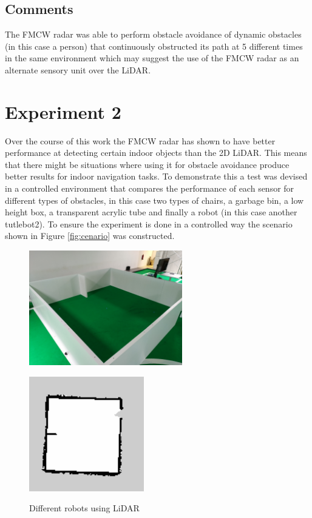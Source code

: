 \subsection{Comments}
 The \ac{FMCW} radar was able to perform 
obstacle avoidance of dynamic obstacles (in this case a person) that continuously obstructed its path at 5 different times in the same environment which may suggest the use of the \ac{FMCW} \ac{radar} as an alternate sensory unit over the \ac{LiDAR}.


\section {Experiment 2}
Over the course of this work the \ac{FMCW} radar has shown to have better performance at detecting certain indoor objects than the 2D \ac{LiDAR}. This means that there might be situations where using it for obstacle avoidance produce better results for indoor navigation tasks. To demonstrate this a test was devised in a controlled environment that compares the performance of each sensor for different types of obstacles, in this case two types of chairs, a garbage bin, a low height box, a transparent acrylic tube and finally a robot (in this case another tutlebot2).  
To ensure the experiment is done in a controlled way the scenario shown in Figure \ref{fig:cenario} was constructed. 
\begin{figure}[ht!] 
    \begin{minipage}[b]{.49\linewidth}
        \includegraphics[height=5cm,width=\linewidth]{imgs/chapter5/mapP.jpg}
        \label{fig:cenario}
    \end{minipage}
    \begin{minipage}[b]{.49\linewidth}
        \includegraphics[height=5cm,width=\linewidth]{imgs/chapter5/map.png}
        \label{fig:map}
    \end{minipage}
    \caption{Different robots using \ac{LiDAR}}
    \label{fig:setup2}
\end{figure}

